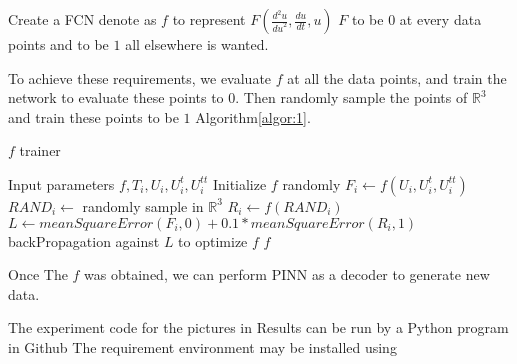 \documentclass{article}
\begin{document}
Create a FCN denote as $f$ to represent
$F(\frac{d^2u}{{du}^2},\frac{du}{dt},u)$
$F$ to be $0$ at every data points and to be $1$ all elsewhere is wanted.

To achieve these requirements, we evaluate $f$ at all the data points,
and train the network to evaluate these points to $0$. Then randomly sample
the points of $\mathbb{R}^{3}$ and train these points to be $1$ Algorithm\ref{algor:1}.


\begin{algorithm}
    \caption{$f$ trainer}\label{algor:1}
    \begin{algorithmic}[1]
        \REQUIRE Input parameters $f,T_i, U_i, U^{t}_{i}, U^{tt}_{i}$
        \STATE Initialize $f$ randomly
        \REPEAT
        \STATE $F_i \leftarrow f(U_i,U^{t}_{i},U^{tt}_{i})$
        \STATE $RAND_i \leftarrow$ randomly sample in $\mathbb{R}^{3}$
        \STATE $R_i \leftarrow f(RAND_i)$
        \STATE $L \leftarrow meanSquareError(F_i,0)+0.1*meanSquareError(R_i,1)$
        \STATE backPropagation against $L$ to optimize $f$
        \RETURN $f$
    \end{algorithmic}
\end{algorithm}

Once The $f$ was obtained, we can perform PINN as a decoder
to generate new data.


The experiment code for the pictures in Results can
be run by a Python program in Github\cite[deSineTasks]{firstApproachGithubProject}
The requirement environment may be installed using\cite[reqs]{Envreqs}
\end{document}
